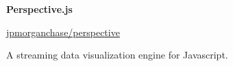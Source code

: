 
\raggedright

{\large\textbf{Perspective.js}}

\href{http://github.com/jpmorganchase/perspective}{jpmorganchase/perspective}

A streaming data visualization engine for Javascript.
